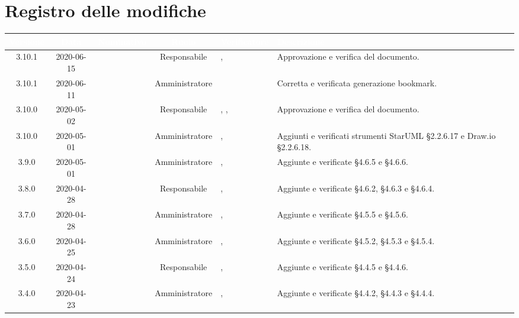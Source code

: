 \section*{Registro delle modifiche}
{
\renewcommand{\arraystretch}{1.5}
\centering
\begin{longtable}{ c c  C{2.3cm} c C{3cm} C{3.2cm}}
\textcolor{white}{\textbf{Versione}}&
\textcolor{white}{\textbf{Data}}&
\textcolor{white}{\textbf{Nominativo}}&
\textcolor{white}{\textbf{Ruolo}}&
\textcolor{white}{\textbf{Verificatore}}&
\textcolor{white}{\textbf{Descrizione}}\\	
\endhead

3.10.1 & 2020-06-15 & \CE{} & Responsabile & \LD{}, \AT{} & Approvazione e verifica del documento. \\

3.10.1 & 2020-06-11 & \CE{} & Amministratore & \AT{} & Corretta e verificata generazione bookmark. \\

3.10.0 & 2020-05-02 & \DF{} & Responsabile & \AT{}, \PF{}, \MC{} &  Approvazione e verifica del documento. \\

3.10.0 & 2020-05-01 & \MC{} & Amministratore &  \AT{}, \PF{} & Aggiunti e verificati strumenti StarUML §2.2.6.17 e Draw.io §2.2.6.18. \\

3.9.0 & 2020-05-01 & \BR{} & Amministratore &  \AT{}, \PF{} & Aggiunte e verificate §4.6.5 e §4.6.6.  \\

3.8.0 & 2020-04-28 & \LD{} & Responsabile &  \AT{}, \PF{} & Aggiunte e verificate §4.6.2, §4.6.3 e §4.6.4.  \\

3.7.0 & 2020-04-28 & \SE{} & Amministratore &  \AT{}, \PF{} & Aggiunte e verificate §4.5.5 e §4.5.6.  \\

3.6.0 & 2020-04-25 & \BR{} & Amministratore &  \AT{}, \PF{} & Aggiunte e verificate §4.5.2, §4.5.3 e §4.5.4.  \\

3.5.0 & 2020-04-24 & \LD{} & Responsabile &  \AT{}, \PF{} & Aggiunte e verificate §4.4.5 e §4.4.6.  \\

3.4.0 & 2020-04-23 & \BR{} & Amministratore &  \AT{}, \PF{} & Aggiunte e verificate §4.4.2, §4.4.3 e §4.4.4.  \\


\end{longtable}}
